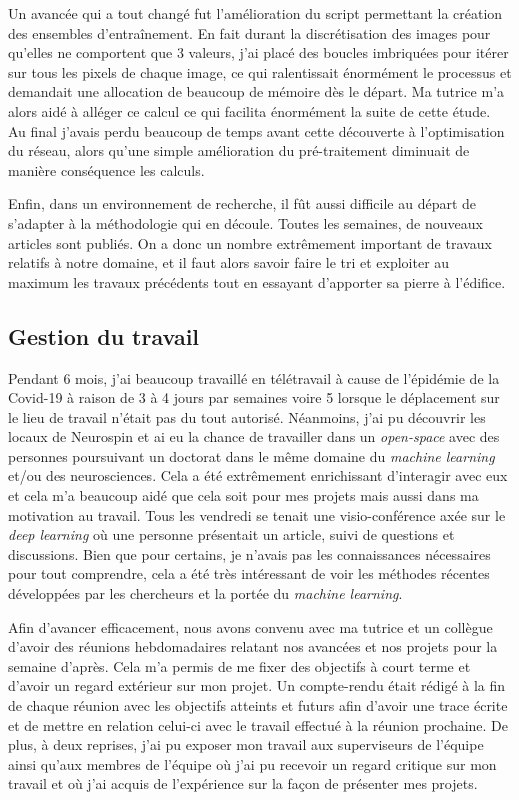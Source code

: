\documentclass[12pt, oneside, a4paper, titlepage]{article}
\begin{document}
Un avancée qui a tout changé fut l'amélioration du script permettant la création des ensembles d'entraînement. En fait durant la discrétisation des images pour qu'elles ne comportent que 3 valeurs, j'ai placé des boucles imbriquées pour itérer sur tous les pixels de chaque image, ce qui ralentissait énormément le processus et demandait une allocation de beaucoup de mémoire dès le départ. Ma tutrice m'a alors aidé à alléger ce calcul ce qui facilita énormément la suite de cette étude. Au final j'avais perdu beaucoup de temps avant cette découverte à l'optimisation du réseau, alors qu'une simple amélioration du pré-traitement diminuait de manière conséquence les calculs.

Enfin, dans un environnement de recherche, il fût aussi difficile au départ de s'adapter à la méthodologie qui en découle. Toutes les semaines, de nouveaux articles sont publiés. On a donc un nombre extrêmement important de travaux relatifs à notre domaine, et il faut alors savoir faire le tri et exploiter au maximum les travaux précédents tout en essayant d'apporter sa pierre à l'édifice.
\subsection{Gestion du travail}

Pendant 6 mois, j'ai beaucoup travaillé en télétravail à cause de l'épidémie de la Covid-19 à raison de 3 à 4 jours par semaines voire 5 lorsque le déplacement sur le lieu de travail n'était pas du tout autorisé. Néanmoins, j'ai pu découvrir les locaux de Neurospin et ai eu la chance de travailler dans un \textit{open-space} avec des personnes poursuivant un doctorat dans le même domaine du \textit{machine learning} et/ou des neurosciences. Cela a été extrêmement enrichissant d'interagir avec eux et cela m'a beaucoup aidé que cela soit pour mes projets mais aussi dans ma motivation au travail. Tous les vendredi se tenait une visio-conférence axée sur le \textit{deep learning} où une personne présentait un article, suivi de questions et discussions. Bien que pour certains, je n'avais pas les connaissances nécessaires pour tout comprendre, cela a été très intéressant de voir les méthodes récentes développées par les chercheurs et la portée du \textit{machine learning}.

Afin d'avancer efficacement, nous avons convenu avec ma tutrice et un collègue d'avoir des réunions hebdomadaires relatant nos avancées et nos projets pour la semaine d'après. Cela m'a permis de me fixer des objectifs à court terme et d'avoir un regard extérieur sur mon projet. Un compte-rendu était rédigé à la fin de chaque réunion avec les objectifs atteints et futurs afin d'avoir une trace écrite et de mettre en relation celui-ci avec le travail effectué à la réunion prochaine. De plus, à deux reprises, j'ai pu exposer mon travail aux superviseurs de l'équipe ainsi qu'aux membres de l'équipe où j'ai pu recevoir un regard critique sur mon travail et où j'ai acquis de l'expérience sur la façon de présenter mes projets.
\end{document}
